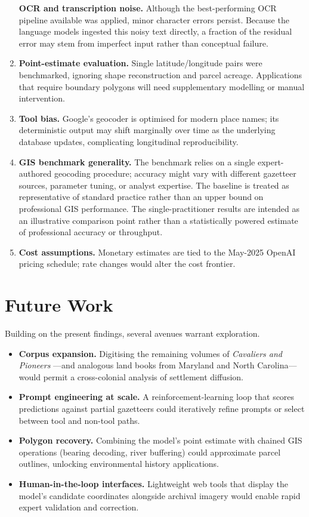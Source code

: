 \begin{enumerate}
  \textbf{OCR and transcription noise.} Although the best-performing OCR
  pipeline available was applied, minor character errors persist.
  Because the language models ingested this noisy text directly, a
  fraction of the residual error may stem from imperfect input rather
  than conceptual failure.
\item
  \textbf{Point-estimate evaluation.} Single latitude/longitude pairs
  were benchmarked, ignoring shape reconstruction and parcel acreage.
  Applications that require boundary polygons will need supplementary
  modelling or manual intervention.
\item
  \textbf{Tool bias.} Google's geocoder is optimised for modern place
  names; its deterministic output may shift marginally over time as the
  underlying database updates, complicating longitudinal
  reproducibility.
\item
  \textbf{GIS benchmark generality.} The benchmark
  \citep{Bashorun2025_gis} relies on a single expert-authored geocoding
  procedure; accuracy might vary with different gazetteer sources,
  parameter tuning, or analyst expertise. The baseline is treated as
  representative of standard practice rather than an upper bound on
  professional GIS performance. The single-practitioner results are
  intended as an illustrative comparison point rather than a
  statistically powered estimate of professional accuracy or throughput.
\item
  \textbf{Cost assumptions.} Monetary estimates are tied to the May-2025
  OpenAI pricing schedule; rate changes would alter the cost frontier.
\end{enumerate}

\section{Future Work}\label{future-work}

Building on the present findings, several avenues warrant exploration.

\begin{itemize}
\tightlist
\item
  \textbf{Corpus expansion.} Digitising the remaining volumes of
  \emph{Cavaliers and Pioneers} \citep{Nugent1979_cavaliers3}---and
  analogous land books from Maryland and North Carolina---would permit a
  cross-colonial analysis of settlement diffusion.
\item
  \textbf{Prompt engineering at scale.} A reinforcement-learning loop
  that scores predictions against partial gazetteers could iteratively
  refine prompts or select between tool and non-tool paths.
\item
  \textbf{Polygon recovery.} Combining the model's point estimate with
  chained GIS operations (bearing decoding, river buffering) could
  approximate parcel outlines, unlocking environmental history
  applications.
\item
  \textbf{Human-in-the-loop interfaces.} Lightweight web tools that
  display the model's candidate coordinates alongside archival imagery
  would enable rapid expert validation and correction.
\end{itemize}

